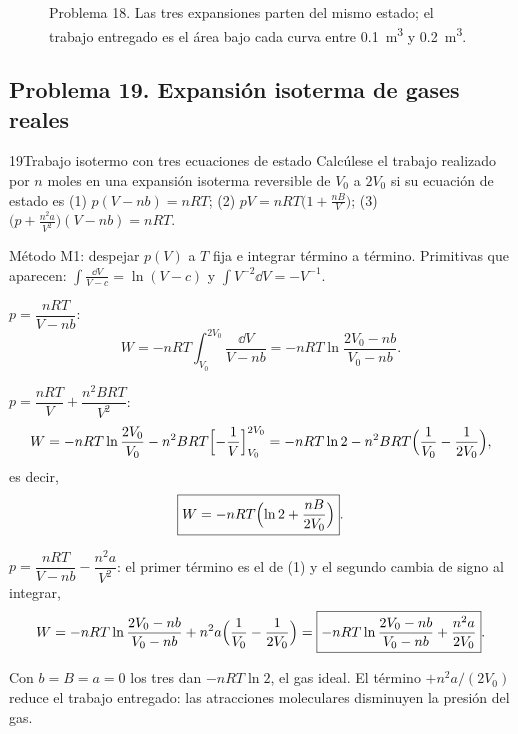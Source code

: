 \begin{figure}[htbp]
\centering
{}
\caption{Problema 18. Las tres expansiones parten del mismo estado; el trabajo entregado es el área bajo cada
curva entre \SI{0,1}{m^3} y \SI{0,2}{m^3}.}
\label{fig:p18}
\end{figure}

\subsection{Problema 19. Expansión isoterma de gases reales}
\begin{problema}{19}{Trabajo isotermo con tres ecuaciones de estado}
Calcúlese el trabajo realizado por $n$ moles en una expansión isoterma reversible de $V_0$ a $2V_0$ si su
ecuación de estado es (1) $p(V-nb)=nRT$; (2) $pV=nRT\bigl(1+\frac{nB}{V}\bigr)$; (3)
$\bigl(p+\frac{n^2a}{V^2}\bigr)(V-nb)=nRT$.
\end{problema}

\begin{resolucion}
\idea Método M1: despejar $p(V)$ a $T$ fija e integrar término a término. Primitivas que aparecen:
$\int\frac{\dd V}{V-c}=\ln(V-c)$ y $\int V^{-2}\dd V=-V^{-1}$.

 $p=\dfrac{nRT}{V-nb}$:
\[
  W=-nRT\int_{V_0}^{2V_0}\frac{\dd V}{V-nb}=\boxed{-nRT\ln\frac{2V_0-nb}{V_0-nb}}.
\]

 $p=\dfrac{nRT}{V}+\dfrac{n^2BRT}{V^2}$:
\[
  W=-nRT\ln\frac{2V_0}{V_0}-n^2BRT\Bigl[-\frac1V\Bigr]_{V_0}^{2V_0}
   =-nRT\ln2-n^2BRT\Bigl(\frac1{V_0}-\frac1{2V_0}\Bigr),
\]
es decir,
\[
  \boxed{W=-nRT\Bigl(\ln2+\frac{nB}{2V_0}\Bigr)}.
\]

 $p=\dfrac{nRT}{V-nb}-\dfrac{n^2a}{V^2}$: el primer término es el de (1) y el segundo
cambia de signo al integrar,
\[
  W=-nRT\ln\frac{2V_0-nb}{V_0-nb}+n^2a\Bigl(\frac1{V_0}-\frac1{2V_0}\Bigr)
   =\boxed{-nRT\ln\frac{2V_0-nb}{V_0-nb}+\frac{n^2a}{2V_0}}.
\]

 Con $b=B=a=0$ los tres dan $-nRT\ln2$, el gas ideal. El término $+n^2a/(2V_0)$ reduce
el trabajo entregado: las atracciones moleculares disminuyen la presión del gas.
\end{resolucion}

